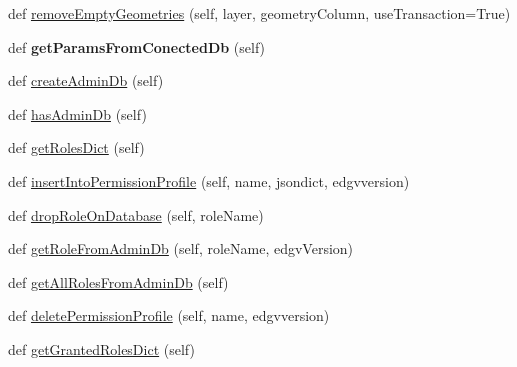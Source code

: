 \begin{DoxyCompactItemize}
\item 
def \mbox{\hyperlink{class_dsg_tools_1_1_factories_1_1_db_factory_1_1postgis_db_1_1_postgis_db_aaca6eee19521634d0f73a2e9281ef149}{remove\+Empty\+Geometries}} (self, layer, geometry\+Column, use\+Transaction=True)
\item 
\mbox{\label{class_dsg_tools_1_1_factories_1_1_db_factory_1_1postgis_db_1_1_postgis_db_ae9c8aac8e7243ce99937bf474edf5f54}} 
def {\bfseries get\+Params\+From\+Conected\+Db} (self)
\item 
def \mbox{\hyperlink{class_dsg_tools_1_1_factories_1_1_db_factory_1_1postgis_db_1_1_postgis_db_abb6d0f167872d464d073857cca981dc4}{create\+Admin\+Db}} (self)
\item 
def \mbox{\hyperlink{class_dsg_tools_1_1_factories_1_1_db_factory_1_1postgis_db_1_1_postgis_db_a30b0ce8ef3ba4e2d9c712a419d99d659}{has\+Admin\+Db}} (self)
\item 
def \mbox{\hyperlink{class_dsg_tools_1_1_factories_1_1_db_factory_1_1postgis_db_1_1_postgis_db_a1610b2ba4a7dce980f65c02acbf15b01}{get\+Roles\+Dict}} (self)
\item 
def \mbox{\hyperlink{class_dsg_tools_1_1_factories_1_1_db_factory_1_1postgis_db_1_1_postgis_db_aefad0da85c6707d0b4c8e52781873d63}{insert\+Into\+Permission\+Profile}} (self, name, jsondict, edgvversion)
\item 
def \mbox{\hyperlink{class_dsg_tools_1_1_factories_1_1_db_factory_1_1postgis_db_1_1_postgis_db_a954277357ca99e90691f346044ed3a91}{drop\+Role\+On\+Database}} (self, role\+Name)
\item 
def \mbox{\hyperlink{class_dsg_tools_1_1_factories_1_1_db_factory_1_1postgis_db_1_1_postgis_db_a8dd4d4bac8f4ccb35d3e1a4d089f29e4}{get\+Role\+From\+Admin\+Db}} (self, role\+Name, edgv\+Version)
\item 
def \mbox{\hyperlink{class_dsg_tools_1_1_factories_1_1_db_factory_1_1postgis_db_1_1_postgis_db_a780e78e0c9234120ff4662bf5892c5a4}{get\+All\+Roles\+From\+Admin\+Db}} (self)
\item 
def \mbox{\hyperlink{class_dsg_tools_1_1_factories_1_1_db_factory_1_1postgis_db_1_1_postgis_db_a8c073034c419bd5513170aceb8d96570}{delete\+Permission\+Profile}} (self, name, edgvversion)
\item 
def \mbox{\hyperlink{class_dsg_tools_1_1_factories_1_1_db_factory_1_1postgis_db_1_1_postgis_db_acc7130a91fa8a1104c3f7d1c4e3fc2f3}{get\+Granted\+Roles\+Dict}} (self)
\item 

\end{DoxyCompactItemize}
